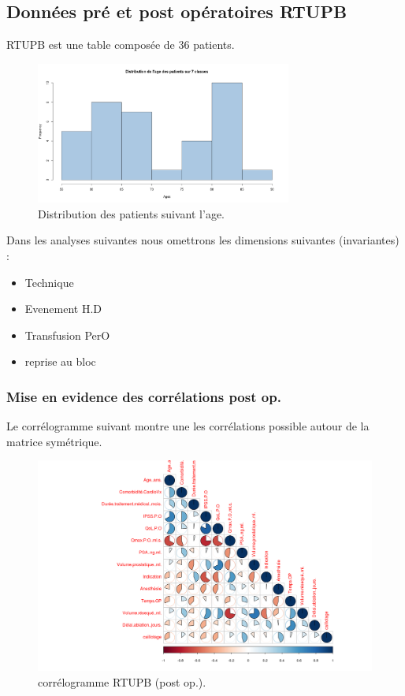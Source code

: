 \subsection{Données pré et post opératoires RTUPB}

RTUPB est une table composée de 36 patients. 
	
\begin{figure}[!h]
\centering
\includegraphics[width=0.75\textwidth]{../Fig/RTUPB/rtupb-age-frequency.png}
\caption{Distribution des patients suivant l'age.}
\end{figure}

Dans les analyses suivantes nous omettrons les dimensions suivantes  (invariantes)  :  

\begin{itemize}
\item Technique
\item Evenement H.D
\item Transfusion PerO
\item reprise au bloc 
\end{itemize}


\subsubsection{Mise en evidence des corrélations post op. }

Le corrélogramme suivant montre une les corrélations possible autour de la matrice symétrique.

\begin{figure}[!h]
\centering
\includegraphics[width=1\textwidth]{../Fig/RTUPB/rtupb-matrice-cor-graph.png}
\caption{corrélogramme RTUPB (post op.).}
\end{figure}

